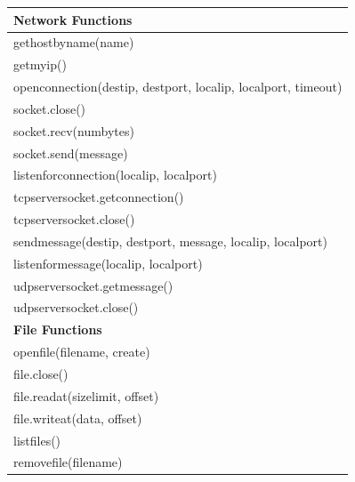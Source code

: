 \begin{table}
\begin{tabular}{|l|}
  \hline
  \textbf{Network Functions} \\
  \hline
  gethostbyname(name) \\
  \hline
  getmyip() \\
  \hline
  openconnection(destip, destport, localip, localport, timeout) \\
  \hline
  socket.close() \\
  \hline
  socket.recv(numbytes) \\
  \hline
  socket.send(message) \\
  \hline
  listenforconnection(localip, localport) \\
  \hline
  tcpserversocket.getconnection() \\
  \hline
  tcpserversocket.close()\\
  \hline
  sendmessage(destip, destport, message, localip, localport) \\
  \hline
  listenformessage(localip, localport) \\
  \hline
  udpserversocket.getmessage() \\
  \hline
  udpserversocket.close() \\
  \hline \hline
  \textbf{File Functions} \\
  \hline
  openfile(filename, create) \\
  \hline
  file.close() \\
  \hline
  file.readat(sizelimit, offset) \\
  \hline
  file.writeat(data, offset) \\
  \hline
  listfiles() \\
  \hline
  removefile(filename) \\

\end{tabular}
\end{table}
